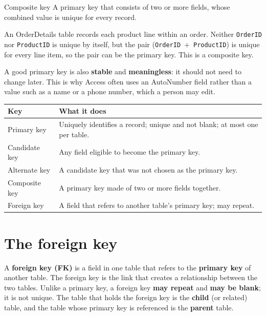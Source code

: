\begin{definitionbox}{Composite key}
A primary key that consists of two or more fields, whose combined value is
unique for every record.
\end{definitionbox}

\begin{example}
An OrderDetails table records each product line within an order. Neither
\texttt{OrderID} nor \texttt{ProductID} is unique by itself, but the pair
(\texttt{OrderID}~+~\texttt{ProductID}) is unique for every line item, so the
pair can be the primary key. This is a composite key.
\end{example}

A good primary key is also \textbf{stable} and \textbf{meaningless}: it should
not need to change later. This is why Access often uses an AutoNumber field
rather than a value such as a name or a phone number, which a person may edit.

\begin{center}
\begin{tabular}{p{}p{}}
\toprule
\textbf{Key} & \textbf{What it does} \\
\midrule
Primary key & Uniquely identifies a record; unique and not blank; at most one per table. \\
Candidate key & Any field eligible to become the primary key. \\
Alternate key & A candidate key that was not chosen as the primary key. \\
Composite key & A primary key made of two or more fields together. \\
Foreign key & A field that refers to another table's primary key; may repeat. \\
\bottomrule
\end{tabular}
\end{center}

\section{The foreign key}
A \textbf{foreign key (FK)} is a field in one table that refers to the
\textbf{primary key} of another table. The foreign key is the link that
creates a relationship between the two tables. Unlike a primary key, a foreign
key \textbf{may repeat} and \textbf{may be blank}; it is not unique. The table
that holds the foreign key is the \textbf{child} (or related) table, and the
table whose primary key is referenced is the \textbf{parent} table.

